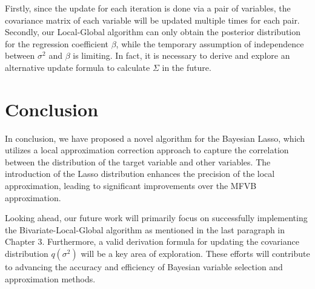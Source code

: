 Firstly, since the update for each iteration is done via a pair of variables, the covariance matrix of each variable will be updated multiple times for each pair.
Secondly, our Local-Global algorithm can only obtain the posterior distribution for the regression coefficient $\beta$, while the temporary assumption of independence between $\sigma^2$ and $\beta$ is limiting. In fact, it is necessary to derive and explore an alternative update formula to calculate $\Sigma$ in the future.

\section{Conclusion}

In conclusion, we have proposed a novel algorithm for the Bayesian Lasso, which utilizes a local approximation correction approach to capture the correlation between the distribution of the target variable and other variables. The introduction of the Lasso distribution enhances the precision of the local approximation, leading to significant improvements over the MFVB approximation.

Looking ahead, our future work will primarily focus on successfully implementing the Bivariate-Local-Global algorithm as mentioned in the last paragraph in Chapter 3. Furthermore, a valid derivation formula for updating the covariance distribution $q(\sigma^2)$ will be a key area of exploration. These efforts will contribute to advancing the accuracy and efficiency of Bayesian variable selection and approximation methods.

